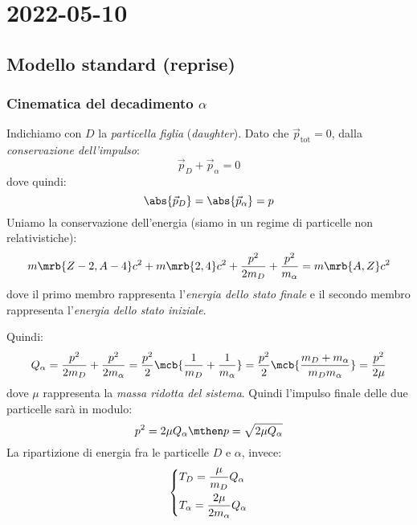 \chapter{2022-05-10}
\section{Modello standard (reprise)}
\subsection{Cinematica del decadimento $\alpha$}
Indichiamo con $D$ la \textit{particella figlia} (\textit{daughter}).
Dato che $\vec{p}_\text{tot} = 0$, dalla \textit{conservazione dell'impulso}:
\begin{equation}
  \vec{p}_D + \vec{p}_{\alpha} = 0
\end{equation}
dove quindi:
\begin{equation}
  \abs{\vec{p}_{D}} = \abs{\vec{p}_{\alpha}} = p
\end{equation}
Uniamo la conservazione dell'energia (siamo in un regime di particelle non
relativistiche):
\begin{equation}
  m \mrb{Z-2, A-4} c^2 + m \mrb{2,4} c^2 + \frac{p^2}{2m_D} + \frac{p^2}{m
  _{\alpha}} = m \mrb{A,Z} c^2
\end{equation}
dove il primo membro rappresenta l'\textit{energia dello stato finale} e il
secondo membro rappresenta l'\textit{energia dello stato iniziale}.

Quindi:
\begin{equation}
  Q _{\alpha} = \frac{p^2}{2 m_D} + \frac{p^2}{2 m _{\alpha}} = \frac{p^2}{2}
  \mcb{\frac{1}{m_D} + \frac{1}{m _{\alpha}}} = \frac{p^2}{2} \mcb{\frac{m_D +
  m _{\alpha}}{m_D m _{\alpha}}} = \frac{p^2}{2 \mu}
\end{equation}
dove $\mu$ rappresenta la \textit{massa ridotta del sistema}. Quindi l'impulso
finale delle due particelle sarà in modulo:
\begin{equation}
  p^2 = 2 \mu Q _{\alpha}
  \mthen
  p = \sqrt{2 \mu Q _{\alpha}}
\end{equation}
La ripartizione di energia fra le particelle $D$ e $\alpha$, invece:
\begin{equation}
  \begin{dcases}
    T_D = \frac{\mu}{m_D} Q _{\alpha}
    \\
    T _{\alpha} = \frac{2 \mu}{2 m _{\alpha}} Q _{\alpha}
  \end{dcases}
\end{equation}


